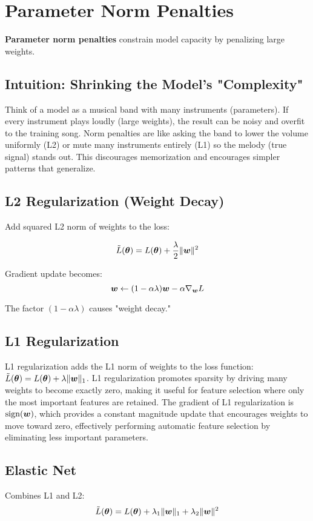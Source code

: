 
\section{Parameter Norm Penalties }
\label{sec:parameter-penalties}

\textbf{Parameter norm penalties} constrain model capacity by penalizing large weights.

\subsection{Intuition: Shrinking the Model's "Complexity"}

Think of a model as a musical band with many instruments (parameters). If every instrument plays loudly (large weights), the result can be noisy and overfit to the training song. Norm penalties are like asking the band to lower the volume uniformly (L2) or mute many instruments entirely (L1) so the melody (true signal) stands out. This discourages memorization and encourages simpler patterns that generalize.

\subsection{L2 Regularization (Weight Decay)}

Add squared L2 norm of weights to the loss:

\begin{equation}
\tilde{L}(\boldsymbol{\theta}) = L(\boldsymbol{\theta}) + \frac{\lambda}{2} \|\boldsymbol{w}\|^2
\end{equation}

Gradient update becomes:
\begin{equation}
\boldsymbol{w} \leftarrow (1 - \alpha\lambda)\boldsymbol{w} - \alpha \nabla_{\boldsymbol{w}} L
\end{equation}

The factor $(1 - \alpha\lambda)$ causes "weight decay."

\subsection{L1 Regularization}

L1 regularization adds the L1 norm of weights to the loss function: $\tilde{L}(\boldsymbol{\theta}) = L(\boldsymbol{\theta}) + \lambda \|\boldsymbol{w}\|_1$. L1 regularization promotes sparsity by driving many weights to become exactly zero, making it useful for feature selection where only the most important features are retained. The gradient of L1 regularization is $\text{sign}(\boldsymbol{w})$, which provides a constant magnitude update that encourages weights to move toward zero, effectively performing automatic feature selection by eliminating less important parameters.


\subsection{Elastic Net}

Combines L1 and L2:
\begin{equation}
\tilde{L}(\boldsymbol{\theta}) = L(\boldsymbol{\theta}) + \lambda_1 \|\boldsymbol{w}\|_1 + \lambda_2 \|\boldsymbol{w}\|^2
\end{equation}

